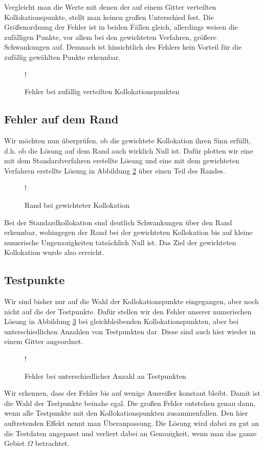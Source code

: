 Vergleicht man die Werte mit denen der auf einem Gitter verteilten Kollokationspunkte, stellt man keinen großen Unterschied fest. Die Größenordnung der Fehler ist in beiden Fällen gleich, allerdings weisen die zufälligen Punkte, vor allem bei den gewichteten Verfahren, größere Schwankungen auf. Demnach ist hinsichtlich des Fehlers kein Vorteil für die zufällig gewählten Punkte erkennbar.

\begin{figure}[ht]
\centering
\resizebox {\columnwidth} {!} {

}
\caption{Fehler bei zufällig verteilten Kollokationspunkten}
\label{fig:error-random}
\end{figure}
\subsection{Fehler auf dem Rand}

Wir möchten nun überprüfen, ob die gewichtete Kollokation ihren Sinn erfüllt, d.h. ob die Lösung auf dem Rand auch wirklich Null ist. Dafür plotten wir eine mit dem Standardverfahren erstellte Lösung und eine mit dem gewichteten Verfahren erstellte Lösung in Abbildung \ref{fig:rand-vergleich} über einen Teil des Randes.

\begin{figure}[ht]
\centering
\resizebox {\columnwidth} {!} {

}
\caption{Rand bei gewichteter Kollokation}
\label{fig:rand-vergleich}
\end{figure}

Bei der Standardkollokation sind deutlich Schwankungen über den Rand erkennbar, wohingegen der Rand bei der gewichteten Kollokation bis auf kleine numerische Ungenauigkeiten tatsächlich Null ist. Das Ziel der gewichteten Kollokation wurde also erreicht.

\subsection{Testpunkte}

Wir sind bisher nur auf die Wahl der Kollokationspunkte eingegangen, aber noch nicht auf die der Testpunkte. Dafür stellen wir den Fehler unserer numerischen Lösung in Abbildung \ref{fig:testpunkte} bei gleichbleibenden Kollokationspunkten, aber bei unterschiedlichen Anzahlen von Testpunkten dar. Diese sind auch hier wieder in einem Gitter angeordnet.
\begin{figure}[H]
\centering
\resizebox {\columnwidth} {!} {

}
\caption{Fehler bei unterschiedlicher Anzahl an Testpunkten}
\label{fig:testpunkte}
\end{figure}
Wir erkennen, dass der Fehler bis auf wenige Ausreißer konstant bleibt. Damit ist die Wahl der Testpunkte beinahe egal. Die großen Fehler entstehen genau dann, wenn alle Testpunkte mit den Kollokationspunkten zusammenfallen. Den hier auftretenden Effekt nennt man Überanpassung. Die Lösung wird dabei zu gut an die Testdaten angepasst und verliert dabei an Genauigkeit, wenn man das ganze Gebiet $\Omega$ betrachtet. 


